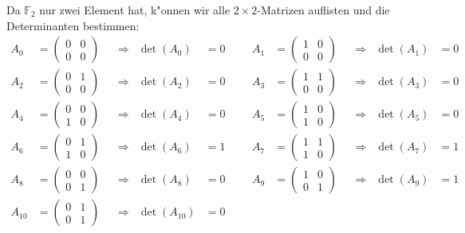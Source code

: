 \begin{beispiel}
Da $\mathbb F_2$ nur zwei Element hat, k"onnen wir alle $2\times 2$-Matrizen
auflisten und die Determinanten bestimmen:
\begin{equation}
\begin{aligned}
A_0   &=\begin{pmatrix}0&0\\0&0\end{pmatrix} &&\Rightarrow&\det(A_0   )&=0&&&
A_1   &=\begin{pmatrix}1&0\\0&0\end{pmatrix} &&\Rightarrow&\det(A_1   )&=0\\
A_2   &=\begin{pmatrix}0&1\\0&0\end{pmatrix} &&\Rightarrow&\det(A_2   )&=0&&&
A_3   &=\begin{pmatrix}1&1\\0&0\end{pmatrix} &&\Rightarrow&\det(A_3   )&=0\\
A_4   &=\begin{pmatrix}0&0\\1&0\end{pmatrix} &&\Rightarrow&\det(A_4   )&=0&&&
A_5   &=\begin{pmatrix}1&0\\1&0\end{pmatrix} &&\Rightarrow&\det(A_5   )&=0\\
A_6   &=\begin{pmatrix}0&1\\1&0\end{pmatrix} &&\Rightarrow&\det(A_6   )&=1&&&
A_7   &=\begin{pmatrix}1&1\\1&0\end{pmatrix} &&\Rightarrow&\det(A_7   )&=1\\
A_8   &=\begin{pmatrix}0&0\\0&1\end{pmatrix} &&\Rightarrow&\det(A_8   )&=0&&&
A_9   &=\begin{pmatrix}1&0\\0&1\end{pmatrix} &&\Rightarrow&\det(A_9   )&=1\\
A_{10}&=\begin{pmatrix}0&1\\0&1\end{pmatrix} &&\Rightarrow&\det(A_{10})&=0&&&

\end{aligned}
\end{equation}
\end{beispiel}
